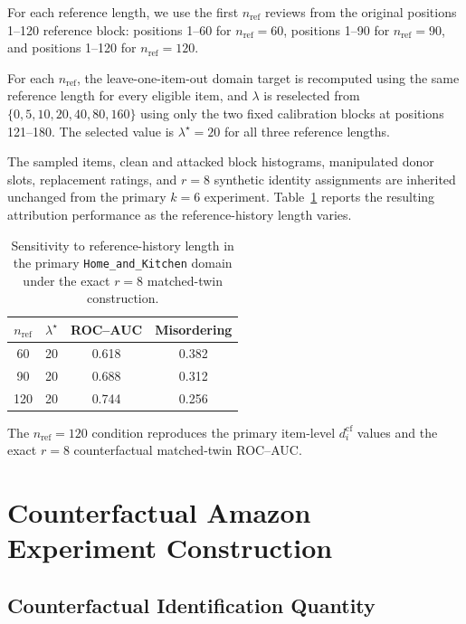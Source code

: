 For each reference length, we use the first $n_{\mathrm{ref}}$ reviews from
the original positions 1--120 reference block: positions 1--60 for
$n_{\mathrm{ref}}=60$, positions 1--90 for $n_{\mathrm{ref}}=90$, and
positions 1--120 for $n_{\mathrm{ref}}=120$.

For each $n_{\mathrm{ref}}$, the leave-one-item-out domain target is recomputed
using the same reference length for every eligible item, and $\lambda$ is
reselected from $\{0,5,10,20,40,80,160\}$ using only the two fixed calibration
blocks at positions 121--180. The selected value is $\lambda^\star=20$ for
all three reference lengths.

The sampled items, clean and attacked block histograms, manipulated donor
slots, replacement ratings, and $r=8$ synthetic identity assignments are
inherited unchanged from the primary $k=6$ experiment. Table~\ref{tab:supp-reference-history} reports the resulting attribution
performance as the reference-history length varies.

\begin{table}[t]
\caption{Sensitivity to reference-history length in the primary
\texttt{Home\_and\_Kitchen} domain under the exact $r=8$
matched-twin construction.}
\label{tab:supp-reference-history}
\centering
\small
\begin{tabular}{@{}cccc@{}}
\toprule
$n_{\mathrm{ref}}$
& $\lambda^\star$
& ROC--AUC
& Misordering \\
\midrule
60  & 20 & 0.618 & 0.382 \\
90  & 20 & 0.688 & 0.312 \\
120 & 20 & 0.744 & 0.256 \\
\bottomrule
\end{tabular}
\end{table}

The $n_{\mathrm{ref}}=120$ condition reproduces the primary item-level $d_i^{\mathrm{cf}}$ values and the exact $r=8$ counterfactual
matched-twin ROC--AUC.


\section{Counterfactual Amazon Experiment Construction}
\label{sec:supp-counterfactual}

\subsection{Counterfactual Identification Quantity}
\label{sec:supp-counterfactual-score}

